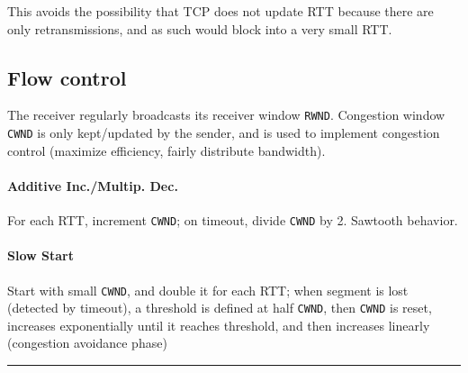 \documentclass{form}
\begin{document}
\begin{minipage}[c]{0.39\textwidth}
    This avoids the possibility that TCP does not update RTT because there are only retransmissions, and as such would block into a very small RTT.

    \subsection*{Flow control}

    The receiver regularly broadcasts its receiver window \texttt{RWND}.
    Congestion window \texttt{CWND} is only kept/updated by the sender, and is used to implement congestion control (maximize efficiency, fairly distribute bandwidth).

    \paragraph{Additive Inc./Multip. Dec.}
    For each RTT, increment \texttt{CWND}; on timeout, divide \texttt{CWND} by 2. Sawtooth behavior.

    \paragraph{Slow Start}
    Start with small \texttt{CWND}, and double it for each RTT; when segment is lost (detected by timeout), a threshold is defined at half \texttt{CWND}, then \texttt{CWND} is reset, increases exponentially until it reaches threshold, and then increases linearly (congestion avoidance phase)
\end{minipage}

\vspace{-0em}\rule{\textwidth}{1.0pt}\vspace{-1.0em}
\end{document}
